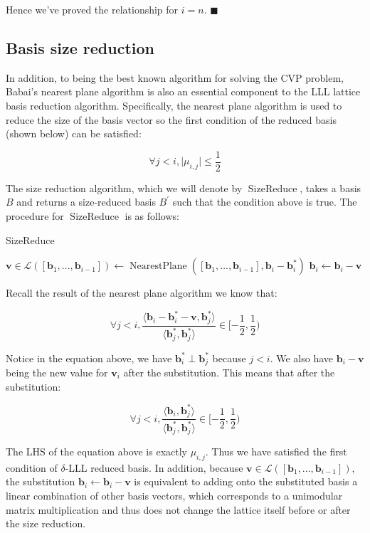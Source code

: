 \documentclass[letterpaper,12pt]{article}
\begin{document}
Hence we've proved the relationship for $i = n$. $\blacksquare$

\subsection{Basis size reduction}
In addition, to being the best known algorithm for solving the CVP problem, Babai's nearest plane algorithm is also an essential component to the LLL lattice basis reduction algorithm. Specifically, the nearest plane algorithm is used to reduce the size of the basis vector so the first condition of the reduced basis (shown below) can be satisfied:

$$
\forall j<i, \vert\mu_{i, j}\vert \leq \frac{1}{2}
$$

The size reduction algorithm, which we will denote by $\operatorname{SizeReduce}$, takes a basis $B$ and returns a size-reduced basis $B^\prime$ such that the condition above is true. The procedure for $\operatorname{SizeReduce}$ is as follows:

\begin{algorithm}
\caption{SizeReduce}
\begin{algorithmic}[1]
        \State $\mathbf{v} \in \mathcal{L}([\mathbf{b}_1, \ldots, \mathbf{b}_{i-1}]) \leftarrow \operatorname{NearestPlane}([\mathbf{b}_1, \ldots, \mathbf{b}_{i-1}], \mathbf{b}_i - \mathbf{b}_i^\ast)$
        \State $\mathbf{b}_i \leftarrow \mathbf{b}_i - \mathbf{v}$
    \EndFor
\end{algorithmic}
\end{algorithm}

Recall the result of the nearest plane algorithm we know that:

$$
\forall j < i,
\frac{
    \langle
        \mathbf{b}_i - \mathbf{b}_i^\ast - \mathbf{v}, \mathbf{b}_j^\ast
    \rangle
}{
    \langle 
        \mathbf{b}_j^\ast, \mathbf{b}_j^\ast
    \rangle
} \in [-\frac{1}{2}, \frac{1}{2})
$$

Notice in the equation above, we have $\mathbf{b}_i^\ast \perp \mathbf{b}_j^\ast$ because $j < i$. We also have $\mathbf{b}_i - \mathbf{v}$ being the new value for $\mathbf{v}_i$ after the substitution. This means that after the substitution:

$$
\forall j < i,
\frac{
    \langle
        \mathbf{b}_i, \mathbf{b}_j^\ast
    \rangle
}{
    \langle
        \mathbf{b}_j^\ast, \mathbf{b}_j^\ast
    \rangle
} \in [-\frac{1}{2}, \frac{1}{2})
$$

The LHS of the equation above is exactly $\mu_{i,j}$. Thus we have satisfied the first condition of $\delta$-LLL reduced basis. In addition, because $\mathbf{v} \in \mathcal{L}([\mathbf{b}_1, \ldots, \mathbf{b}_{i-1}])$, the substitution $\mathbf{b}_i \leftarrow \mathbf{b}_i - \mathbf{v}$ is equivalent to adding onto the substituted basis a linear combination of other basis vectors, which corresponds to a unimodular matrix multiplication and thus does not change the lattice itself before or after the size reduction.
\end{document}
